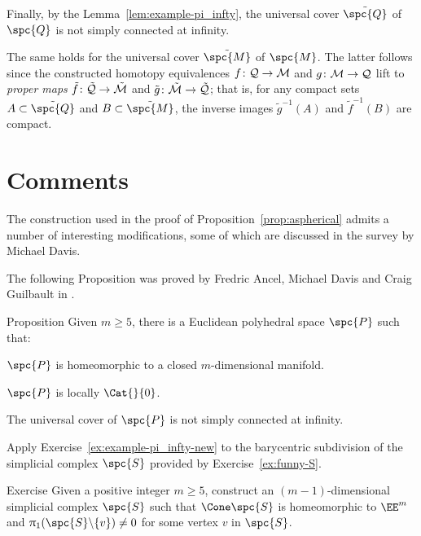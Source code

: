 Finally, by the Lemma~\ref{lem:example-pi_infty},  
the universal cover $\tilde{\spc{Q}}$ of $\spc{Q}$
is not simply connected at infinity.

The same holds for 
the universal cover $\tilde{\spc{M}}$ of $\spc{M}$.
The latter follows since the constructed homotopy equivalences 
$f\: \spc Q\to \spc M$ and $g\:\spc M\to \spc Q$ 
lift to \emph{proper maps} 
$\tilde f \: \tilde{\spc{Q}}\to \tilde{\spc{M}}$
and $\tilde g \: \tilde{\spc{M}}\to \tilde{\spc{Q}}$;
that is, for any compact sets $A\subset \tilde{\spc{Q}}$ and $B\subset\tilde{\spc{M}}$, the inverse images $\tilde g^{-1}(A)$ and $\tilde f^{-1}(B)$ are compact.
\qeds


\section{Comments}

The construction used in the proof of  Proposition~\ref{prop:aspherical} admits a number of interesting modifications,  
some of which are discussed in the survey \cite{davis-survey} by Michael Davis.

The following Proposition was proved by Fredric Ancel, 
Michael Davis and Craig Guilbault in \cite{ADG}. 


\begin{thm}{Proposition}\label{prop:loc-CAT-mnfld}
Given $m\ge 5$, there is a Euclidean polyhedral space $\spc{P}$ such that:
\begin{subthm}{}
$\spc{P}$ is homeomorphic to a closed $m$-dimensional manifold.
\end{subthm}

\begin{subthm}{}
$\spc{P}$ is locally $\Cat{}{0}$.
\end{subthm}

\begin{subthm}{}
The universal cover of $\spc{P}$ is not simply connected at infinity.
\end{subthm}
\end{thm}

Apply Exercise~\ref{ex:example-pi_infty-new} to the barycentric subdivision of the simplicial complex $\spc{S}$ provided by Exercise~\ref{ex:funny-S}.
\qeds

\begin{thm}{Exercise}\label{ex:funny-S}
Given a positive integer $m\ge 5$,
construct an $(m-1)$-dimensional simplicial complex $\spc{S}$ such that $\Cone\spc{S}$ is homeomorphic to $\EE^m$
and $\pi_1(\spc{S}\backslash\{v\})\ne0$ for some vertex $v$ in $\spc{S}$.
\end{thm}



